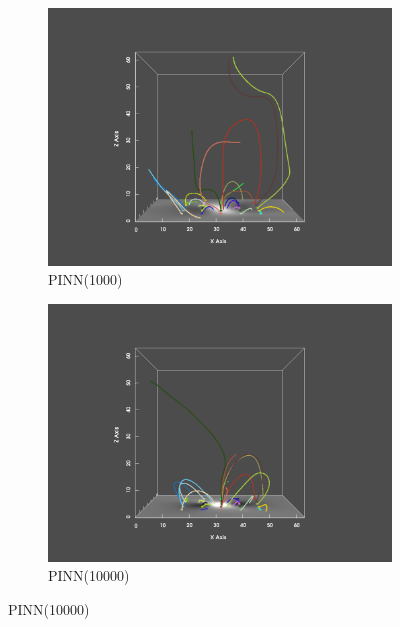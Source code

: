 \begin{figure}
  \begin{subfigure}{.5\linewidth}
    \centering
    \caption{PINN(1000)}
    \includegraphics[trim={6cm 1cm 6cm 2cm}, clip, width=\linewidth]{"img/PINN_001000_xz.pdf"}
  \end{subfigure}%
  \begin{subfigure}{.5\linewidth}
    \centering
    \caption{PINN(10000)}
    \includegraphics[trim={6cm 1cm 6cm 2cm}, clip, width=\linewidth]{"img/PINN_010000_xz.pdf"}
  \end{subfigure}


\end{figure}
